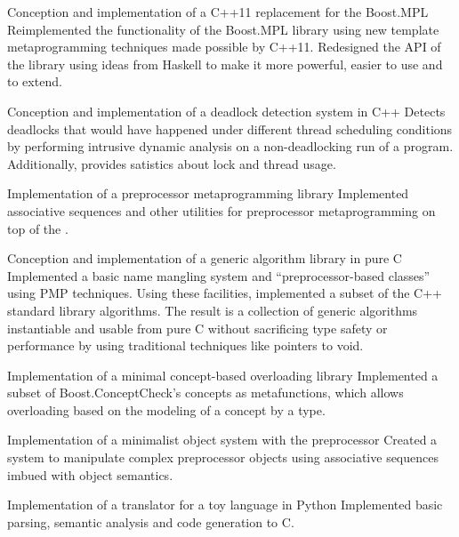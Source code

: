 \documentclass[10pt]{moderncv}
\newcommand{\myhref}[3][blue]{\href{#2}{\color{#1}{#3}}}
\begin{document}
{Conception and implementation of a C++11 replacement for the Boost.MPL}{
    Reimplemented the functionality of the Boost.MPL library using new
    template metaprogramming techniques made possible by C++11. Redesigned
    the API of the library using ideas from Haskell to make it more powerful,
    easier to use and to extend.}

{Conception and implementation of a deadlock detection system in C++}{
    Detects deadlocks that would have happened under different thread scheduling
    conditions by performing intrusive dynamic analysis on a non-deadlocking run
    of a program. Additionally, provides satistics about lock and thread usage.}

{Implementation of a preprocessor metaprogramming library}{
    Implemented associative sequences and other utilities for preprocessor
    metaprogramming on top of the
    \myhref{http://sourceforge.net/projects/chaos-pp}{Chaos preprocessor library}.}

{Conception and implementation of a generic algorithm library in pure C}{
    Implemented a basic name mangling system and ``preprocessor-based classes''
    using PMP techniques. Using these facilities, implemented a subset of the
    C++ standard library algorithms. The result is a collection of generic
    algorithms instantiable and usable from pure C without sacrificing type
    safety or performance by using traditional techniques like pointers to void.}

{Implementation of a minimal concept-based overloading library}{
    Implemented a subset of Boost.ConceptCheck's concepts as metafunctions,
    which allows overloading based on the modeling of a concept by a type.}

{Implementation of a minimalist object system with the preprocessor}{
    Created a system to manipulate complex preprocessor objects using
    associative sequences imbued with object semantics.}

{Implementation of a translator for a toy language in Python}{
    Implemented basic parsing, semantic analysis and code generation to C.}
\end{document}

